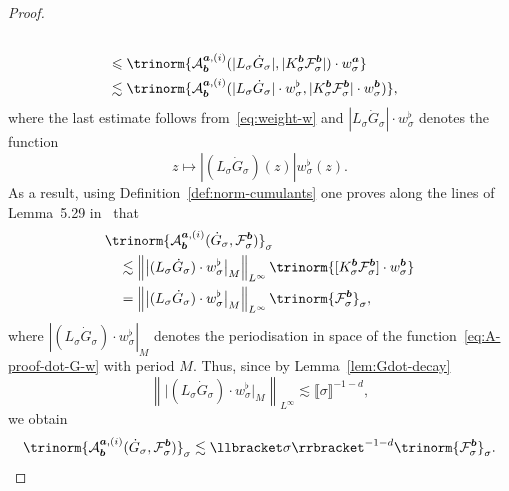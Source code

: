 \documentclass{article}
\numberwithin{equation}{section}
\theoremstyle{plain}
\theoremstyle{definition}
\begin{document}
\begin{proof}
\[\begin{aligned}
{       }\\
       & \leqslant  \trinorm{ \mathcal{A}^{\boldsymbol{a},
       (i)}_{\boldsymbol{b}} (| L_{\sigma} \dot{G}_{\sigma} |, |
       K_{\sigma}^{\boldsymbol{b}} \mathcal{F}^{\boldsymbol{b}}_{\sigma} |) \cdot
       w_{\sigma}^{\boldsymbol{a}} }\\
       & \lesssim  \trinorm{ \mathcal{A}^{\boldsymbol{a},
       (i)}_{\boldsymbol{b}} (| L_{\sigma} \dot{G}_{\sigma} | \cdot
       w_{\sigma}^{\flat}, | K_{\sigma}^{\boldsymbol{b}}
       \mathcal{F}^{\boldsymbol{b}}_{\sigma} | \cdot w_{\sigma}^{\boldsymbol{b}})
       },
     \end{aligned} \]
  where the last estimate follows from~\eqref{eq:weight-w} and $| L_{\sigma}
  \dot{G}_{\sigma} | \cdot w_{\sigma}^{\flat}$ denotes the function
  \begin{equation}
    z \mapsto | (L_{\sigma} \dot{G}_{\sigma}) (z) | w_{\sigma}^{\flat} (z) .
    \label{eq:A-proof-dot-G-w}
  \end{equation}
  As a result, using Definition~\ref{def:norm-cumulants} one proves along the lines
  of Lemma~5.29 in~{\cite{duchFlowEquationApproach2021}} that
  \begin{align*}
     &\trinorm{ \mathcal{A}^{\boldsymbol{a}, (i)}_{\boldsymbol{b}}
     (\dot{G}_{\sigma}, \mathcal{F}^{\boldsymbol{b}}_{\sigma})
     }_{\sigma}\\
     &\quad \lesssim \left\| \big| (L_{\sigma} \dot{G}_{\sigma})
     \cdot w_{\sigma}^{\flat} \big|_M  \right\|_{L^{\infty}}
     \trinorm{ [K_{\sigma}^{\boldsymbol{b}}
     \mathcal{F}^{\boldsymbol{b}}_{\sigma}] \cdot w_{\sigma}^{\boldsymbol{b}}
     }\\
     &\quad = \left\| \big| (L_{\sigma} \dot{G}_{\sigma})
     \cdot w_{\sigma}^{\flat} \big|_M  \right\|_{L^{\infty}}
     \trinorm{ \mathcal{F}^{\boldsymbol{b}}_{\sigma}
     }_{\sigma},
  \end{align*}
  where $| (L_{\sigma} \dot{G }_{\sigma} ) \cdot w_{\sigma}^{\flat} | _M$
  denotes the periodisation in space of the
  function~\eqref{eq:A-proof-dot-G-w} with period $M$. Thus, since by
  Lemma~\ref{lem:Gdot-decay}
  \[ \left\| \big| (L_{\sigma} \dot{G }_{\sigma} ) \cdot w_{\sigma}^{\flat}
     \big| _M  \right\|_{L^{\infty}} \lesssim \llbracket \sigma
     \rrbracket^{- 1 - d}, \]
  we obtain
  \[ \trinorm{ \mathcal{A}^{\boldsymbol{a}, (i)}_{\boldsymbol{b}}
     (\dot{G}_{\sigma}, \mathcal{F}^{\boldsymbol{b}}_{\sigma})
     }_{\sigma} \lesssim \llbracket \sigma \rrbracket^{- 1 - d} 
     \trinorm{ \mathcal{F}^{\boldsymbol{b}}_{\sigma} }_{\sigma} .
  \]
  

\end{proof}
\end{document}
